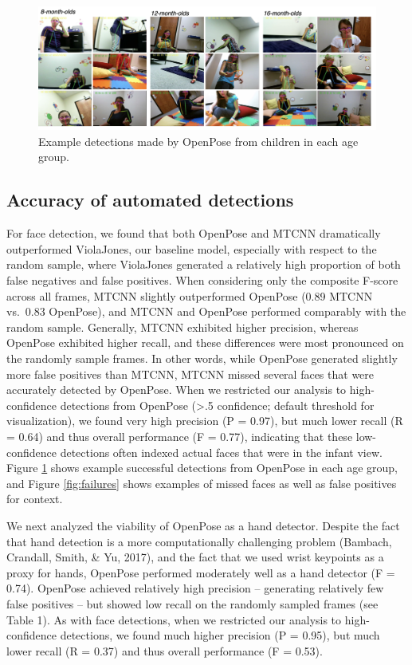 \documentclass[english,man]{apa6}
\begin{document}
\begin{figure}[H]
\includegraphics[width=1\linewidth]{images/exampe_detections} \caption{Example detections made by OpenPose from children in each age group.}\label{fig:exampledetections}
\end{figure}

\subsection{Accuracy of automated
detections}\label{accuracy-of-automated-detections}

For face detection, we found that both OpenPose and MTCNN dramatically
outperformed ViolaJones, our baseline model, especially with respect to
the random sample, where ViolaJones generated a relatively high
proportion of both false negatives and false positives. When considering
only the composite F-score across all frames, MTCNN slightly
outperformed OpenPose (0.89 MTCNN vs.~0.83 OpenPose), and MTCNN and
OpenPose performed comparably with the random sample. Generally, MTCNN
exhibited higher precision, whereas OpenPose exhibited higher recall,
and these differences were most pronounced on the randomly sample
frames. In other words, while OpenPose generated slightly more false
positives than MTCNN, MTCNN missed several faces that were accurately
detected by OpenPose. When we restricted our analysis to high-confidence
detections from OpenPose (\textgreater{}.5 confidence; default threshold
for visualization), we found very high precision (P = 0.97), but much
lower recall (R = 0.64) and thus overall performance (F = 0.77),
indicating that these low-confidence detections often indexed actual
faces that were in the infant view. Figure \ref{fig:exampledetections}
shows example successful detections from OpenPose in each age group, and
Figure \ref{fig:failures} shows examples of missed faces as well as
false positives for context.

We next analyzed the viability of OpenPose as a hand detector. Despite
the fact that hand detection is a more computationally challenging
problem (Bambach, Crandall, Smith, \& Yu, 2017), and the fact that we
used wrist keypoints as a proxy for hands, OpenPose performed moderately
well as a hand detector (F = 0.74). OpenPose achieved relatively high
precision -- generating relatively few false positives -- but showed low
recall on the randomly sampled frames (see Table 1). As with face
detections, when we restricted our analysis to high-confidence
detections, we found much higher precision (P = 0.95), but much lower
recall (R = 0.37) and thus overall performance (F = 0.53).
\end{document}
